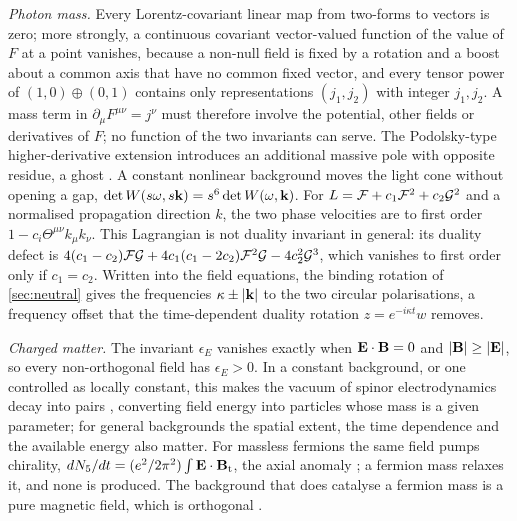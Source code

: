 \emph{Photon mass.} Every Lorentz-covariant linear map from two-forms to vectors is zero; more strongly, a continuous covariant
vector-valued function of the value of $F$ at a point vanishes, because a non-null field is fixed by a rotation and a boost about a common
axis that have no common fixed vector, and every tensor power of $(1,0)\oplus(0,1)$ contains only representations $(j_1,j_2)$ with integer
$j_1,j_2$. A mass term in $\partial_\mu F^{\mu\nu}=j^\nu$ must therefore involve the potential, other fields or derivatives of $F$; no
function of the two invariants can serve. The Podolsky-type higher-derivative extension introduces an additional massive pole with opposite residue, a ghost \cite{Podolsky42}. A constant
nonlinear background moves the light cone without opening a gap, $\det W(s\omega,s\mathbf k)=s^6\det W(\omega,\mathbf k)$. For $L=\mathcal F+c_1\mathcal F^2+c_2\mathcal G^2$
and a normalised propagation direction $k$, the two phase velocities are to first order $1-c_i\Theta^{\mu\nu}k_\mu k_\nu$. This Lagrangian is not
duality invariant in general: its duality defect is $4(c_1-c_2)\mathcal F\mathcal G+4c_1(c_1-2c_2)\mathcal F^2\mathcal G-4c_2^2\mathcal G^3$, which vanishes to first order only
if $c_1=c_2$.
Written into the field equations, the binding rotation of \cref{sec:neutral} gives the frequencies $\kappa\pm|\mathbf k|$ to the two circular
polarisations, a frequency offset that the time-dependent duality rotation $z=e^{-i\kappa t}w$ removes.

\emph{Charged matter.} The invariant $\epsilon_E$ vanishes exactly when $\mathbf E\cdot\mathbf B=0$ and $|\mathbf B|\ge|\mathbf E|$, so every non-orthogonal field
has $\epsilon_E>0$. In a constant background, or one controlled as locally constant, this makes the vacuum of spinor electrodynamics decay
into pairs \cite{Schwinger51}, converting field energy into particles whose mass is a given parameter; for general backgrounds the spatial
extent, the time dependence and the available energy also matter. For massless fermions the same field pumps chirality, $dN_5/dt=(e^2/2\pi^2)\int\mathbf E\cdot\mathbf B_{\rm t}$,
the axial anomaly \cite{Adler69,BellJackiw69,NielsenNinomiya83}; a fermion mass relaxes it, and none is produced. The background that does
catalyse a fermion mass is a pure magnetic field, which is orthogonal \cite{GusyninMiranskyShovkovy95}.

